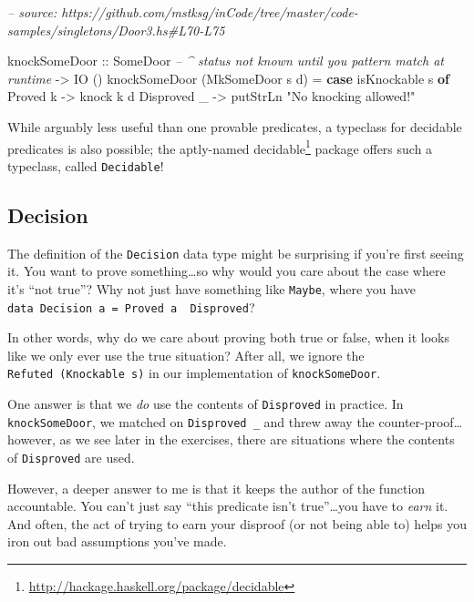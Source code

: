 \documentclass[]{article}
\newenvironment{Shaded}{}{}
\newcommand{\CommentTok}[1]{\textcolor[rgb]{0.38,0.63,0.69}{\textit{#1}}}
\newcommand{\DataTypeTok}[1]{\textcolor[rgb]{0.56,0.13,0.00}{#1}}
\newcommand{\FunctionTok}[1]{\textcolor[rgb]{0.02,0.16,0.49}{#1}}
\newcommand{\KeywordTok}[1]{\textcolor[rgb]{0.00,0.44,0.13}{\textbf{#1}}}
\newcommand{\NormalTok}[1]{#1}
\newcommand{\OtherTok}[1]{\textcolor[rgb]{0.00,0.44,0.13}{#1}}
\newcommand{\StringTok}[1]{\textcolor[rgb]{0.25,0.44,0.63}{#1}}
\renewcommand{\href}[2]{#2\footnote{\url{#1}}}
\begin{document}
\begin{Shaded}
\begin{Highlighting}[]
\CommentTok{-- source: https://github.com/mstksg/inCode/tree/master/code-samples/singletons/Door3.hs#L70-L75}

\NormalTok{knockSomeDoor}
\OtherTok{    ::} \DataTypeTok{SomeDoor}     \CommentTok{-- ^ status not known until you pattern match at runtime}
    \OtherTok{->} \DataTypeTok{IO}\NormalTok{ ()}
\NormalTok{knockSomeDoor (}\DataTypeTok{MkSomeDoor}\NormalTok{ s d) }\FunctionTok{=} \KeywordTok{case}\NormalTok{ isKnockable s }\KeywordTok{of}
    \DataTypeTok{Proved}\NormalTok{ k    }\OtherTok{->}\NormalTok{ knock k d}
    \DataTypeTok{Disproved}\NormalTok{ _ }\OtherTok{->}\NormalTok{ putStrLn }\StringTok{"No knocking allowed!"}
\end{Highlighting}
\end{Shaded}

While arguably less useful than one provable predicates, a typeclass for
decidable predicates is also possible; the aptly-named
\href{http://hackage.haskell.org/package/decidable}{decidable} package offers
such a typeclass, called \texttt{Decidable}!

\hypertarget{decision}{%
\subsection{Decision}\label{decision}}

The definition of the \texttt{Decision} data type might be surprising if you're
first seeing it. You want to prove something\ldots{}so why would you care about
the case where it's ``not true''? Why not just have something like
\texttt{Maybe}, where you have
\texttt{data\ Decision\ a\ =\ Proved\ a\ \textbar{}\ Disproved}?

In other words, why do we care about proving both true or false, when it looks
like we only ever use the true situation? After all, we ignore the
\texttt{Refuted\ (Knockable\ s)} in our implementation of
\texttt{knockSomeDoor}.

One answer is that we \emph{do} use the contents of \texttt{Disproved} in
practice. In \texttt{knockSomeDoor}, we matched on \texttt{Disproved\ \_} and
threw away the counter-proof\ldots{}however, as we see later in the exercises,
there are situations where the contents of \texttt{Disproved} are used.

However, a deeper answer to me is that it keeps the author of the function
accountable. You can't just say ``this predicate isn't true''\ldots{}you have to
\emph{earn} it. And often, the act of trying to earn your disproof (or not being
able to) helps you iron out bad assumptions you've made.
\end{document}
